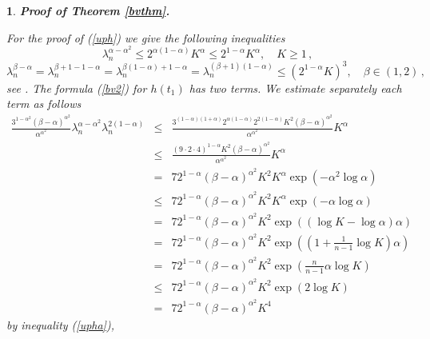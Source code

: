 \documentclass[12pt,a4paper,leqno]{amsart}
\theoremstyle{plain}
\newtheorem{subsec}[equation]{}
\numberwithin{equation}{section}          %
\begin{document}
\begin{subsec} {\bf Proof of Theorem \ref{bvthm}.}
{For the proof of (\ref{uph}) we give the following inequalities
\begin{equation}\label{upha}
\lambda_n^{\alpha- \alpha^2}\leq 2^{\alpha(1- \alpha)}K^\alpha
\leq 2^{1- \alpha}K^\alpha, \quad K\geq 1 \,,
\end{equation}
\begin{equation}\label{uphb}
\lambda_n^{\beta- \alpha}= \lambda_n^{\beta+1-1- \alpha}= \lambda_n^{\beta(1-\alpha)+1- \alpha}
=\lambda_n^{(\beta+1)(1-\alpha)}\leq(2^{1-\alpha}K)^3,\quad \beta\in(1,2) \,,
\end{equation}
see \cite[Lemma 7.50(1)]{vuobook}. The formula (\ref{bv2}) for
$h(t_1)$ has two terms. We estimate separately each term as follows
\begin{eqnarray*}
\frac{3^{1-\alpha^2} (\beta-\alpha)^{\alpha^2}}{\alpha^{\alpha^2}} \lambda_n^{\alpha- \alpha^2}\lambda_n^{2(1-\alpha)}
&\leq& \frac{3^{(1-\alpha)(1+\alpha)}2^{\alpha(1-\alpha)}2^{2(1-\alpha)}K^2 (\beta-\alpha)^{\alpha^2}}{\alpha^{\alpha^2}} K^\alpha\\
&\leq& \frac{(9\cdot 2\cdot 4)^{1-\alpha} K^2(\beta-\alpha)^{\alpha^2}}{\alpha^{\alpha^2}} K^\alpha\\
&=& 72^{1-\alpha}(\beta-\alpha)^{\alpha^2}K^2K^\alpha\exp(-\alpha^2\log\alpha)\\
&\leq & 72^{1-\alpha}(\beta-\alpha)^{\alpha^2}K^2K^{\alpha}\exp(-\alpha\log\alpha)\\
&=& 72^{1-\alpha}(\beta-\alpha)^{\alpha^2}K^2\exp((\log K-\log\alpha)\alpha)\\
&= & 72^{1-\alpha}(\beta-\alpha)^{\alpha^2}K^2\exp\left(\left(1+\frac{1}{n-1}\log K\right)\alpha\right)\\
&=& 72^{1-\alpha}(\beta-\alpha)^{\alpha^2}K^2\exp\left(\frac{n}{n-1}\alpha\log K\right)\\
&\leq& 72^{1-\alpha}(\beta-\alpha)^{\alpha^2}K^2\exp(2\log K)\\
&= & 72^{1-\alpha}(\beta-\alpha)^{\alpha^2}K^4
\end{eqnarray*}
by inequality (\ref{upha}),

}
\end{subsec}
\end{document}

